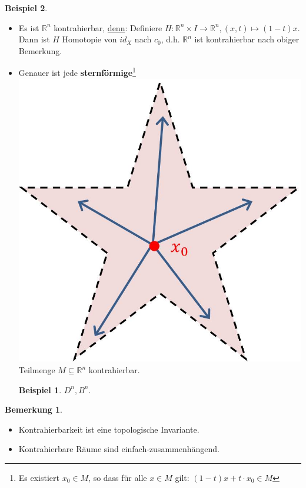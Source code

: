 \documentclass[a4paper,11pt,notitlepage]{report}
\theoremstyle{definition}
\newtheorem{remark}{Bemerkung}[chapter]
\newtheorem{example}{Beispiel}[chapter]
\newcommand{\R}{{\ensuremath{\mathbb{R}}}}
\begin{document}
\begin{example}{}
$ $
\begin{itemize}
	\item Es ist $\R^n$ kontrahierbar, \underline{denn}: \newline
	Definiere $H \colon \R^n \times I \rightarrow \R^n, (x,t) \mapsto (1-t)x$.
	Dann ist $H$ Homotopie von $id_X$ nach $c_0$, d.h. $\R^n$ ist kontrahierbar nach obiger Bemerkung.
	\item Genauer ist jede \textbf{sternförmige}\footnote{Es existiert $x_0 \in M$, so dass für alle $x \in M$ gilt: $(1-t)x + t \cdot x_0 \in M$} \includegraphics[scale=0.3]{images/sternfoermig.jpg} Teilmenge $M \subseteq \R^n$ kontrahierbar.
		\begin{example}
			$D^n, B^n$.
		\end{example}
\end{itemize}
\end{example}

\begin{remark}
	$ $
	\begin{itemize}
		\item Kontrahierbarkeit ist eine topologische Invariante.
		\item Kontrahierbare Räume sind einfach-zusammenhängend.
	\end{itemize}
\end{remark}
\end{document}
